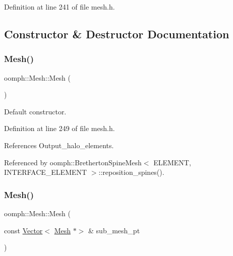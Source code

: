 Definition at line 241 of file mesh.\+h.



\subsection{Constructor \& Destructor Documentation}
\mbox{\label{classoomph_1_1Mesh_aa4a64cb23aa881dbd67c1b633173494f}} 
\subsubsection{\texorpdfstring{Mesh()}{Mesh()}\hspace{0.1cm}{\footnotesize\ttfamily [1/3]}}
{\footnotesize\ttfamily oomph\+::\+Mesh\+::\+Mesh (\begin{DoxyParamCaption}{ }\end{DoxyParamCaption})\hspace{0.3cm}{\ttfamily [inline]}}



Default constructor. 



Definition at line 249 of file mesh.\+h.



References Output\+\_\+halo\+\_\+elements.



Referenced by oomph\+::\+Bretherton\+Spine\+Mesh$<$ E\+L\+E\+M\+E\+N\+T, I\+N\+T\+E\+R\+F\+A\+C\+E\+\_\+\+E\+L\+E\+M\+E\+N\+T $>$\+::reposition\+\_\+spines().

\mbox{\label{classoomph_1_1Mesh_afe38ebeb7d88a020c90636d54ed67180}} 
\subsubsection{\texorpdfstring{Mesh()}{Mesh()}\hspace{0.1cm}{\footnotesize\ttfamily [2/3]}}
{\footnotesize\ttfamily oomph\+::\+Mesh\+::\+Mesh (\begin{DoxyParamCaption}\item[{const \hyperlink{classoomph_1_1Vector}{Vector}$<$ \hyperlink{classoomph_1_1Mesh}{Mesh} $\ast$$>$ \&}]{sub\+\_\+mesh\+\_\+pt }\end{DoxyParamCaption})\hspace{0.3cm}{\ttfamily [inline]}}




